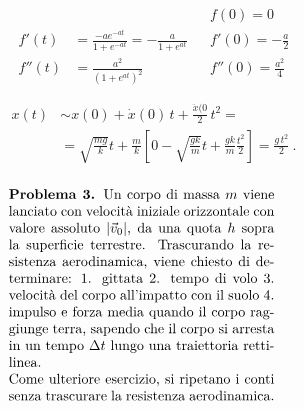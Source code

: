 \documentclass[letterpaper,10pt,italian]{jupyterBook}
\begin{document}
\begin{equation*}
\begin{split}\begin{aligned}
         &                                                           && f  (0) = 0             \\
  f' (t) & = \frac{-a e^{-at}}{1 + e^{-at}} = -\frac{a}{1 + e^{at}}  && f' (0) = -\frac{a}{2}  \\
  f''(t) & = \frac{a^2}{\left( 1 + e^{at} \right)^2}                 && f''(0) = \frac{a^2}{4} \\
\end{aligned}\end{split}
\end{equation*}\begin{equation*}
\begin{split}\begin{aligned}
  x(t) 
  & \sim x(0) + \dot{x}(0) \, t + \frac{\ddot{x}(0}{2} \, t^2  = \\
  & = \sqrt{\frac{mg}{k}} t + \frac{m}{k} \left[ 0 - \sqrt{\frac{gk}{m}} t + \frac{g k}{m} \frac{t^2}{2} \right]
    = \frac{ g \, t^2}{2} \ .
\end{aligned}\end{split}
\end{equation*}\begin{align*}\!\begin{aligned}
\begin{minipage}[t]{.55\textwidth}
  \vspace{0pt}
  \textbf{Problema 3.}
Un corpo di massa $m$ viene lanciato con velocità iniziale orizzontale con valore assoluto $|\vec{v}_0|$, da una quota $h$ sopra la superficie terrestre. Trascurando la resistenza aerodinamica, viene chiesto di determinare:
1. gittata
2. tempo di volo
3. velocità del corpo all'impatto con il suolo
4. impulso e forza media quando il corpo raggiunge terra, sapendo che il corpo si arresta in un tempo $\Delta t$ lungo una traiettoria rettilinea.\\
Come ulteriore esercizio, si ripetano i conti senza trascurare la resistenza aerodinamica.
\end{minipage}
\hspace{.05\textwidth}
\begin{minipage}[t]{.40\textwidth}
  \vspace{0pt}

\end{minipage}
\end{aligned}
\end{align*}
\end{document}
